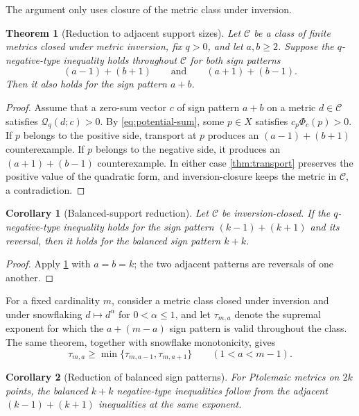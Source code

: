 \documentclass[11pt]{amsart}
\newtheorem{theorem}{Theorem}[section]
\newtheorem{corollary}[corollary]{Corollary}
\theoremstyle{definition}
\theoremstyle{remark}
\newcommand{\Qform}{\mathcal Q}
\begin{document}
The argument only uses closure of the metric class under inversion.

\begin{theorem}[Reduction to adjacent support sizes]\label{thm:neighbor-reduction}
Let $\mathcal C$ be a class of finite metrics closed under metric inversion,
fix $q>0$, and let $a,b\ge2$.  Suppose the $q$-negative-type inequality
holds throughout $\mathcal C$ for both sign patterns
\[
 (a-1)+(b+1)
 \qquad\text{and}\qquad
 (a+1)+(b-1).
\]
Then it also holds for the sign pattern $a+b$.
\end{theorem}

\begin{proof}
Assume that a zero-sum vector $c$ of sign pattern $a+b$ on a metric
$d\in\mathcal C$ satisfies $\Qform_q(d;c)>0$.  By
\eqref{eq:potential-sum}, some $p\in X$ satisfies
$c_p\Phi_c(p)>0$.  If $p$ belongs to the positive side, transport at $p$
produces an $(a-1)+(b+1)$ counterexample.  If $p$ belongs to the negative
side, it produces an $(a+1)+(b-1)$ counterexample.  In either case
\cref{thm:transport} preserves the positive value of the quadratic form,
and inversion-closure keeps the metric in $\mathcal C$, a contradiction.
\end{proof}

\begin{corollary}[Balanced-support reduction]\label{thm:balanced-reduction}
Let $\mathcal C$ be inversion-closed.  If the $q$-negative-type inequality
holds for the sign pattern $(k-1)+(k+1)$ and its reversal, then it holds for
the balanced sign pattern $k+k$.
\end{corollary}

\begin{proof}
Apply \cref{thm:neighbor-reduction} with $a=b=k$; the two adjacent
patterns are reversals of one another.
\end{proof}

For a fixed cardinality $m$, consider a metric class closed under inversion
and under snowflaking $d\mapsto d^\alpha$ for $0<\alpha\le1$, and let
$\tau_{m,a}$ denote the supremal exponent for which the $a+(m-a)$ sign
pattern is valid throughout the class.  The same theorem, together with
snowflake monotonicity, gives
\begin{equation}\label{eq:support-minimum-principle}
 \tau_{m,a}\ge
 \min\{\tau_{m,a-1},\tau_{m,a+1}\}
 \qquad(1<a<m-1).
\end{equation}

\begin{corollary}[Reduction of balanced sign patterns]\label{cor:balanced-redundant}
For Ptolemaic metrics on $2k$ points, the balanced $k+k$ negative-type
inequalities follow from the adjacent $(k-1)+(k+1)$ inequalities at the
same exponent.
\end{corollary}
\end{document}
